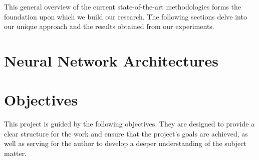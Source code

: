 This general overview of the current state-of-the-art methodologies forms the
foundation upon which we build our research. The following sections delve into
our unique approach and the results obtained from our experiments.

\section{Neural Network Architectures}\todo{}

\section{Objectives}\label{objectives}

This project is guided by the following objectives. They are designed to
provide a clear structure for the work and ensure that the project's goals are
achieved, as well as serving for the author to develop a deeper understanding
of the subject matter.

